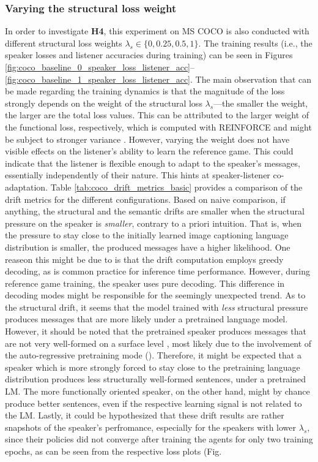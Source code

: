 \subsubsection{Varying the structural loss weight}
In order to investigate \textbf{H4}, this experiment on MS COCO is also conducted with different structural loss weights $\lambda_s \in \{0, 0.25, 0.5, 1\}$. The training results (i.e., the speaker losses and listener accuracies during training) can be seen in Figures \ref{fig:coco_baseline_0_speaker_loss_listener_acc}--\ref{fig:coco_baseline_1_speaker_loss_listener_acc}. The main observation that can be made regarding the training dynamics is that the magnitude of the loss strongly depends on the weight of the structural loss $\lambda_s$---the smaller the weight, the larger are the total loss values. This can be attributed to the larger weight of the functional loss, respectively, which is computed with REINFORCE and might be subject to stronger variance \parencite[cf.][]{havrylov2017emergence}. However, varying the weight does not have visible effects on the listener's ability to learn the reference game. This could indicate that the listener is flexible enough to adapt to the speaker's messages, essentially independently of their nature. This hints at speaker-listener co-adaptation. Table \ref{tab:coco_drift_metrics_basic} provides a comparison of the drift metrics for the different configurations. Based on naive comparison, if anything, the structural and the semantic drifts are smaller when the structural pressure on the speaker is \emph{smaller}, contrary to a priori intuition. That is, when the pressure to stay close to the initially learned image captioning language distribution is smaller, the produced messages have a higher likelihood. One reaseon this might be due to is that the drift computation employs greedy decoding, as is common practice for inference time performance. However, during reference game training, the speaker uses pure decoding. This difference in decoding modes might be responsible for the seemingly unexpected trend. As to the structural drift, it seems that the model trained with \emph{less} structural pressure produces messages that are more likely under a pretrained language model. However, it should be noted that the pretrained speaker produces messages that are not very well-formed on a surface level , most likely due to the involvement of the auto-regressive pretraining mode (). Therefore, it might be expected that a speaker which is more strongly forced to stay close to the pretraining language distribution produces less structurally well-formed sentences, under a pretrained LM. The more functionally oriented speaker, on the other hand, might by chance produce better sentences, even if the respective learning signal is not related to the LM. Lastly, it could be hypothesized that these drift results are rather snapshots of the speaker's perfromance, especially for the speakers with lower $\lambda_s$, since their policies did not converge after training the agents for only two training epochs, as can be seen from the respective loss plots (Fig. 